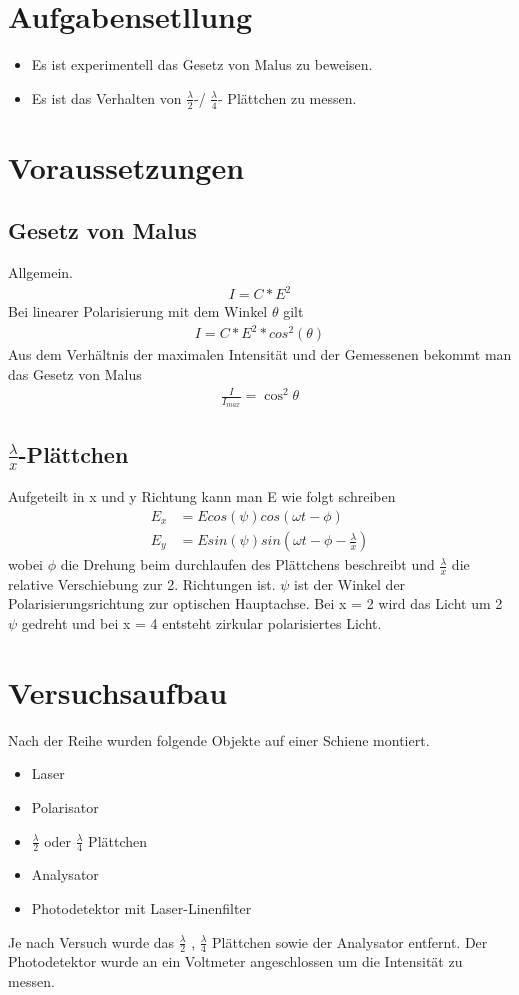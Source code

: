 \documentclass[a4paper]{article}
\begin{document}
\section{Aufgabensetllung}
\begin{itemize}
\item
  Es ist experimentell das Gesetz von Malus zu beweisen.
\item
  Es ist das Verhalten von $\frac{\lambda}{2}$-/ $\frac{\lambda}{4}$- Plättchen zu messen.
\end{itemize}

\section{Voraussetzungen}
\subsection{Gesetz von Malus}
Allgemein.
\begin{align}
  I = C * E^2 
\end{align}
Bei linearer Polarisierung mit dem Winkel $\theta$ gilt
\begin{align}
  I = C * E^2 * cos^2(\theta) 
\end{align}
Aus dem Verhältnis der maximalen Intensität und der Gemessenen bekommt man das Gesetz von Malus
\begin{align}
    \frac{I}{I_{max}}= \cos^2{\theta}
\end{align}
\subsection{$\frac{\lambda}{x}$-Plättchen}
Aufgeteilt in x und y Richtung kann man E wie folgt schreiben
\begin{align}
  E_x &= E cos(\psi) cos(\omega t - \phi)\\
  E_y &= E sin(\psi) sin(\omega t - \phi - \frac{\lambda}{x})
\end{align}
wobei $\phi$ die Drehung beim durchlaufen des Plättchens beschreibt und $\frac{\lambda}{x}$ die relative Verschiebung zur 2. Richtungen ist. $\psi$ ist der Winkel der Polarisierungsrichtung zur optischen Hauptachse.
Bei x = 2 wird das Licht um 2 $\psi$ gedreht und bei x = 4 entsteht zirkular polarisiertes Licht.

\section{Versuchsaufbau}
Nach der Reihe wurden folgende Objekte auf einer Schiene montiert.
\begin{itemize}
\item Laser
\item Polarisator
\item $\frac{\lambda}{2}$ oder $\frac{\lambda}{4}$ Plättchen
\item Analysator
\item Photodetektor mit Laser-Linenfilter
\end{itemize}
Je nach Versuch wurde das $\frac{\lambda}{2}$ , $\frac{\lambda}{4}$ Plättchen sowie der Analysator entfernt.
Der Photodetektor wurde an ein Voltmeter angeschlossen um die Intensität zu messen.
\end{document}
